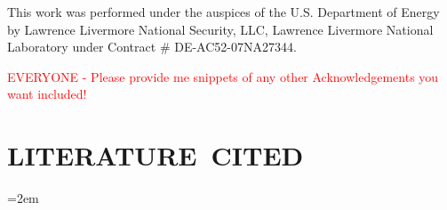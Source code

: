 \documentclass[letterpaper]{ar-1col}
\newcommand{\textred}[1]{\textcolor{red}{ #1}}
\begin{document}
This work was performed under the auspices of the U.S. Department of Energy by Lawrence Livermore National Security,
LLC, Lawrence Livermore National Laboratory under Contract \# DE-AC52-07NA27344.

\textred{EVERYONE - Please provide me snippets of any other Acknowledgements you want included!}

%
\section*{LITERATURE\ CITED}

\emergencystretch=2em









 

\end{document}
